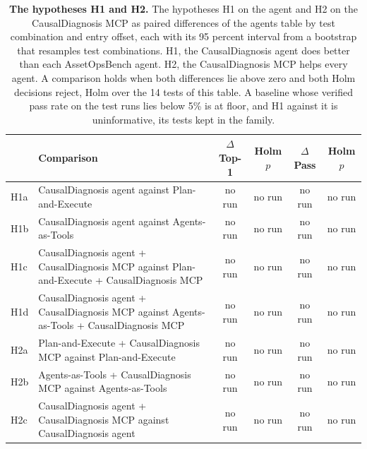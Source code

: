 \documentclass[10pt]{article}
\begin{document}
\begin{table}[H]\centering\footnotesize
\caption{\textbf{The hypotheses H1 and H2.} The hypotheses H1 on the agent and H2 on the CausalDiagnosis MCP as paired differences of the agents table by test combination and entry offset, each with its 95 percent interval from a bootstrap that resamples test combinations. H1, the CausalDiagnosis agent does better than each AssetOpsBench agent. H2, the CausalDiagnosis MCP helps every agent. A comparison holds when both differences lie above zero and both Holm decisions reject, Holm over the 14 tests of this table. A baseline whose verified pass rate on the test runs lies below 5\% is at floor, and H1 against it is uninformative, its tests kept in the family.}
\label{tab:hyp}
\setlength{\tabcolsep}{3pt}
\begin{tabular}{l>{\raggedright\arraybackslash}p{8.8cm}cccc}
\toprule
 & Comparison & $\Delta$Top-1 & Holm $p$ & $\Delta$Pass & Holm $p$ \\
\midrule
H1a & CausalDiagnosis agent against Plan-and-Execute & no run & no run & no run & no run \\
H1b & CausalDiagnosis agent against Agents-as-Tools & no run & no run & no run & no run \\
H1c & CausalDiagnosis agent + CausalDiagnosis MCP against Plan-and-Execute + CausalDiagnosis MCP & no run & no run & no run & no run \\
H1d & CausalDiagnosis agent + CausalDiagnosis MCP against Agents-as-Tools + CausalDiagnosis MCP & no run & no run & no run & no run \\
\midrule
H2a & Plan-and-Execute + CausalDiagnosis MCP against Plan-and-Execute & no run & no run & no run & no run \\
H2b & Agents-as-Tools + CausalDiagnosis MCP against Agents-as-Tools & no run & no run & no run & no run \\
H2c & CausalDiagnosis agent + CausalDiagnosis MCP against CausalDiagnosis agent & no run & no run & no run & no run \\
\bottomrule
\end{tabular}
\end{table}
\vspace{-8pt}
\end{document}
